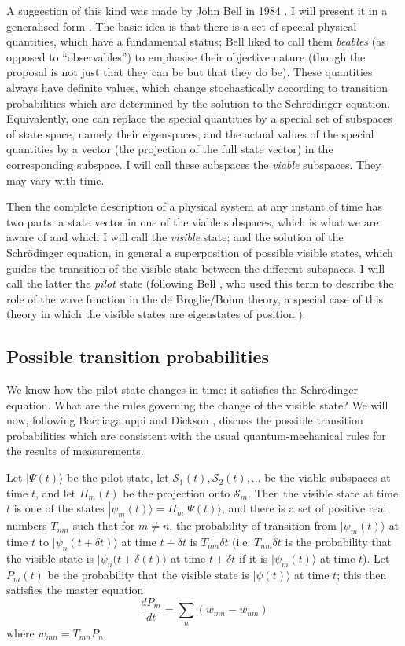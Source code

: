 \documentclass[12pt,a4paper,reqno]{article}
\renewcommand{\(}{\left(}
\renewcommand{\)}{\right)}
\renewcommand{\S}{\mathcal{S}}
\newcommand{\<}{\langle}
\renewcommand{\>}{\rangle}
\theoremstyle{plain} %
\theoremstyle{definition}
\theoremstyle{remark}
\begin{document}
A suggestion of this kind was made by John Bell in 1984 \cite{Bell:beables}.
I will present it in a generalised form \cite{QMPN, determlimit,
Bub:book}. The basic idea is that there is a set of special physical
quantities, which have a fundamental status; Bell liked to call them
\emph{beables} (as opposed to ``observables'') to emphasise their
objective nature (though the proposal is not just that they can be but
that they do be). These quantities always have definite
values, which change stochastically according to transition
probabilities which are determined by the solution to the Schr\"odinger
equation. Equivalently, one can replace the special quantities by a special set of
subspaces of state space, namely their eigenspaces, and the actual values of the
special quantities by a vector (the projection of the full state vector)
in the corresponding subspace. I will call these subspaces the
\emph{viable} subspaces. They may vary with time.

Then the complete description of a physical system at any
instant of time has two parts: a state vector in one of the viable subspaces, 
which is what we are aware of and which I will call the {\em visible} 
state; and the solution of the Schr\"odinger equation, in general a superposition 
of possible visible states, which guides the transition of the visible
state between the different subspaces. I will call the latter the {\em pilot} state
(following Bell \cite{Bell:pilot}, who used this term to describe the role of the wave
function in the de Broglie/Bohm theory, a special case of this theory in which 
the visible states are eigenstates of position \cite{determlimit}).

\subsection{Possible transition probabilities}

We know how the pilot state changes in time: it satisfies the
Schr\"odinger equation. What are the rules governing the change of the
visible state? We will now, following Bacciagaluppi and Dickson
\cite{BacciaDickson}, discuss the possible transition probabilities
which are consistent with the usual quantum-mechanical rules for the
results of measurements. 

Let $|\Psi(t)\>$ be the pilot state, let $\S_1(t), \S_2(t),
\ldots$ be the viable subspaces at time $t$, and let 
$\Pi_m(t)$ be the projection onto $\S_m$. Then the visible state at
time $t$ is one of the states $|\psi_m(t)\>=\Pi_m|\Psi(t)\>$,
and there is a set of positive real numbers $T_{nm}$ such that for 
$m \ne n$, the probability of transition from $|\psi_m(t)\>$ at time $t$
to $|\psi_n(t+\delta t)\>$ at time $t + \delta t$ is $T_{nm}\delta t$
(i.e. $T_{nm}\delta t$ is the probability that the visible state is
$|\psi_n(t+\delta (t)\>$ at time $t + \delta t$ if it is $|\psi_m(t)\>$ 
at time $t$). Let $P_m(t)$ be the probability that the visible state is
$|\psi(t)\>$ at time $t$; this then satisfies the master equation
\begin{equation}\label{master}
\frac{dP_m}{dt} = \sum_n(w_{mn} - w_{nm})
\end{equation}
where $w_{mn} = T_{mn}P_n$.
\end{document}
